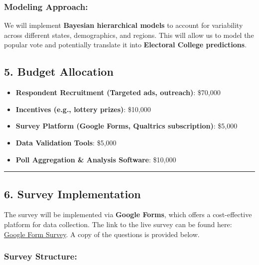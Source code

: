 \documentclass[
  letterpaper,
  DIV=11,
  numbers=noendperiod]{scrartcl}
\providecommand{\tightlist}{%
  \setlength{\itemsep}{0pt}\setlength{\parskip}{0pt}}\usepackage{longtable,booktabs,array}
\begin{document}
\subsubsection{\texorpdfstring{\textbf{Modeling
Approach}:}{Modeling Approach:}}\label{modeling-approach}

We will implement \textbf{Bayesian hierarchical models} to account for
variability across different states, demographics, and regions. This
will allow us to model the popular vote and potentially translate it
into \textbf{Electoral College predictions}.

\subsection{\texorpdfstring{\textbf{5. Budget
Allocation}}{5. Budget Allocation}}\label{budget-allocation}

\begin{itemize}
\tightlist
\item
  \textbf{Respondent Recruitment (Targeted ads, outreach)}: \$70,000\\
\item
  \textbf{Incentives (e.g., lottery prizes)}: \$10,000\\
\item
  \textbf{Survey Platform (Google Forms, Qualtrics subscription)}:
  \$5,000\\
\item
  \textbf{Data Validation Tools}: \$5,000\\
\item
  \textbf{Poll Aggregation \& Analysis Software}: \$10,000
\end{itemize}

\begin{center}\rule{0.5\linewidth}{0.5pt}\end{center}

\subsection{\texorpdfstring{\textbf{6. Survey
Implementation}}{6. Survey Implementation}}\label{survey-implementation}

The survey will be implemented via \textbf{Google Forms}, which offers a
cost-effective platform for data collection. The link to the live survey
can be found here: \href{https://forms.gle/RC1464SvLvtoAYdv6}{Google
Form Survey}. A copy of the questions is provided below.

\subsubsection{\texorpdfstring{\textbf{Survey
Structure}:}{Survey Structure:}}\label{survey-structure}
\end{document}

